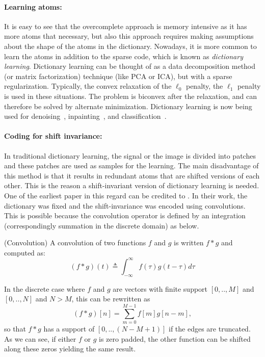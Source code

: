 \paragraph{Learning atoms:} It is easy to see that the overcomplete approach is memory intensive as it has more atoms that necessary, but also this approach requires making assumptions about the shape of the atoms in the dictionary. Nowadays, it is more common to learn the atoms in addition to the sparse code, which is known as \emph{dictionary learning}. Dictionary learning can be thought of as a data decomposition method (or matrix factorization) technique (like \ac{PCA} or \ac{ICA}), but with a sparse regularization. Typically, the convex relaxation of the $\ell_0$ penalty, the $\ell_1$ penalty is used in these situations. The problem is biconvex after the relaxation, and can therefore be solved by alternate minimization. Dictionary learning is now being used for denoising~\citep{elad2006image}, inpainting~\citep{mairal2009online}, and classification~\citep{mairal2009supervised}. 

\paragraph{Coding for shift invariance:}
In traditional dictionary learning, the signal or the image is divided into patches and these patches are used as samples for the learning. The main disadvantage of this method is that it results in redundant atoms that are shifted versions of each other. This is the reason a shift-invariant version of dictionary learning is needed. One of the earliest paper in this regard can be credited to \cite{lewicki1999coding}. In their work, the dictionary was fixed and the shift-invariance was encoded using convolutions. 
This is possible because the convolution operator is defined by an integration (correspondingly summation in the discrete domain) as below.
\vspace{\parskip}
%
\begin{definition}{(Convolution)}
\label{def:convolution}
A convolution of two functions $f$ and $g$ is written $f * g$ and computed as:
\begin{equation}
(f * g)(t) \triangleq \int_{-\infty}^{\infty} f(\tau)g(t-\tau) d\tau
\end{equation}
\end{definition}

In the discrete case where $f$ and $g$ are vectors with finite support $[0,..,M]$ and $[0,..,N]$ and $N > M$, this can be rewritten as
%
\begin{equation}
(f * g)[n] = \sum_{m=0}^{M-1} f[m]g[n-m],
\end{equation}
%
so that $f * g$ has a support of $[0,..,(N - M + 1)]$ if the edges are truncated. As we can see, if either $f$ or $g$ is zero padded, the other function can be shifted along these zeros yielding the same result.

